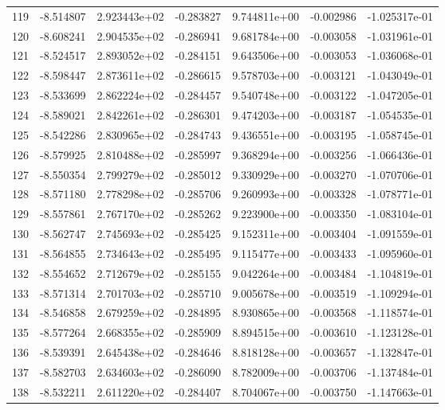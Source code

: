\begin{tabular}{rrrrrrr}
 119 &  -8.514807 &  2.923443e+02 & -0.283827 &  9.744811e+00 &   -0.002986 & -1.025317e-01 \\
 120 &  -8.608241 &  2.904535e+02 & -0.286941 &  9.681784e+00 &   -0.003058 & -1.031961e-01 \\
 121 &  -8.524517 &  2.893052e+02 & -0.284151 &  9.643506e+00 &   -0.003053 & -1.036068e-01 \\
 122 &  -8.598447 &  2.873611e+02 & -0.286615 &  9.578703e+00 &   -0.003121 & -1.043049e-01 \\
 123 &  -8.533699 &  2.862224e+02 & -0.284457 &  9.540748e+00 &   -0.003122 & -1.047205e-01 \\
 124 &  -8.589021 &  2.842261e+02 & -0.286301 &  9.474203e+00 &   -0.003187 & -1.054535e-01 \\
 125 &  -8.542286 &  2.830965e+02 & -0.284743 &  9.436551e+00 &   -0.003195 & -1.058745e-01 \\
 126 &  -8.579925 &  2.810488e+02 & -0.285997 &  9.368294e+00 &   -0.003256 & -1.066436e-01 \\
 127 &  -8.550354 &  2.799279e+02 & -0.285012 &  9.330929e+00 &   -0.003270 & -1.070706e-01 \\
 128 &  -8.571180 &  2.778298e+02 & -0.285706 &  9.260993e+00 &   -0.003328 & -1.078771e-01 \\
 129 &  -8.557861 &  2.767170e+02 & -0.285262 &  9.223900e+00 &   -0.003350 & -1.083104e-01 \\
 130 &  -8.562747 &  2.745693e+02 & -0.285425 &  9.152311e+00 &   -0.003404 & -1.091559e-01 \\
 131 &  -8.564855 &  2.734643e+02 & -0.285495 &  9.115477e+00 &   -0.003433 & -1.095960e-01 \\
 132 &  -8.554652 &  2.712679e+02 & -0.285155 &  9.042264e+00 &   -0.003484 & -1.104819e-01 \\
 133 &  -8.571314 &  2.701703e+02 & -0.285710 &  9.005678e+00 &   -0.003519 & -1.109294e-01 \\
 134 &  -8.546858 &  2.679259e+02 & -0.284895 &  8.930865e+00 &   -0.003568 & -1.118574e-01 \\
 135 &  -8.577264 &  2.668355e+02 & -0.285909 &  8.894515e+00 &   -0.003610 & -1.123128e-01 \\
 136 &  -8.539391 &  2.645438e+02 & -0.284646 &  8.818128e+00 &   -0.003657 & -1.132847e-01 \\
 137 &  -8.582703 &  2.634603e+02 & -0.286090 &  8.782009e+00 &   -0.003706 & -1.137484e-01 \\
 138 &  -8.532211 &  2.611220e+02 & -0.284407 &  8.704067e+00 &   -0.003750 & -1.147663e-01 \\

\end{tabular}
